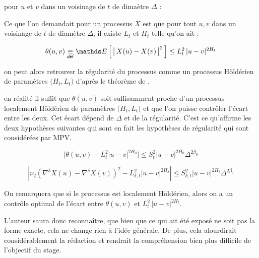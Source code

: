 
pour $u$ et $v$ dans un voisinage de $t$ de dimaètre $\Delta$ :


Ce que l'on demandait pour un processus $X$ est que pour tout $u,v$ dans un voisinage de $t$ de diamètre $\Delta$, il existe  $L_t$ et $H_t$ telle qu'on ait :

\begin{equation*}
	\theta(u,v) \isdef \esperance{ \bigl\vert \, X(u) - X(v) \, \bigr\vert^2 } \leq L_t^2 \, \vert u - v \vert^{2 H_t}
\end{equation*}

on peut alors retrouver la régularité du processus comme un processus Höldérien de paramètres $\bigl(H_t, L_t\bigr)$ d'après le théorème de .

en réalité il suffit que $\theta(u,v)$ soit suffisamment proche d'un processus localement Höldérien de paramètres $\bigl(H_t, L_t\bigr)$ et que l'on puisse contrôler l'écart entre les deux. Cet écart dépend de $\Delta$ et de la régularité. C'est ce qu'affirme les deux hypothèses suivantes qui sont en fait les hypothèses de régularité qui sont considérées par MPV\cite{maissoro-SmoothnessFTSweakDep}.

\begin{equation*}
	\bigl\vert \theta(u,v)-L_{t}^{2}|u-v|^{2H_{0}}\bigr\vert\leq S_{t}^{2}|u-v|^{2H_{0}}\Delta^{2\beta_{0}}
\end{equation*}

\cite[H6]{maissoro-SmoothnessFTSweakDep}

\begin{equation*}
	\left|\nu_{2}\left(\nabla^{\delta}X(u)-\nabla^{\delta}X(v)\right)^{2}-L_{\delta,t}^{2}|u-v|^{2H_\delta}\right|\leq S_{\delta,t}^{2}|u-v|^{2H_\delta}\Delta^{2\beta_{\delta}}
\end{equation*}


\cite[D1-7]{maissoro-SmoothnessFTSweakDep}


On remarquera que si le processus est localement Höldérien, alors on a un contrôle optimal de l'écart entre $\theta(u,v)$ et $L_t^2 \, \vert u - v \vert^{2 H_t}$.

L'auteur saura donc reconnaître, que bien que ce qui ait été exposé ne soit pas la forme exacte, cela ne change rien à l'idée générale. De plus, cela alourdirait considérablement la rédaction et rendrait la compréhension bien plus difficile de l'objectif du stage.
